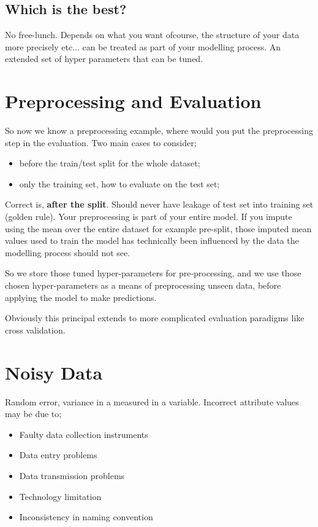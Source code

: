 \documentclass{article}
\begin{document}
\subsection{Which is the best?}
No free-lunch. Depends on what you want ofcourse, the structure of your data more precisely etc... can be treated as part of your modelling process. An extended set of hyper parameters that can be tuned.

\section{Preprocessing and Evaluation}
So now we know a preprocessing example, where would you put the preprocessing step in the evaluation. Two main cases to consider;

\begin{itemize}
	\item before the train/test split for the whole dataset;
	\item only the training set, how to evaluate on the test set;
\end{itemize}

Correct is, {\bf after the split}. Should never have leakage of test set into training set (golden rule). Your preprocessing is part of your entire model. If you impute using the mean over the entire dataset for example pre-split, those imputed mean values used to train the model has technically been influenced by the data the modelling process should not see.

So we store those tuned hyper-parameters for pre-processing, and we use those chosen hyper-parameters as a means of preprocessing unseen data, before applying the model to make predictions.

Obviously this principal extends to more complicated evaluation paradigms like cross validation.

\section{Noisy Data}
Random error, variance in a measured in a variable. Incorrect attribute values may be due to;

\begin{itemize}
	\item Faulty data collection instruments
	\item Data entry problems
	\item Data transmission problems
	\item Technology limitation
	\item Inconsistency in naming convention
\end{itemize}
\end{document}
